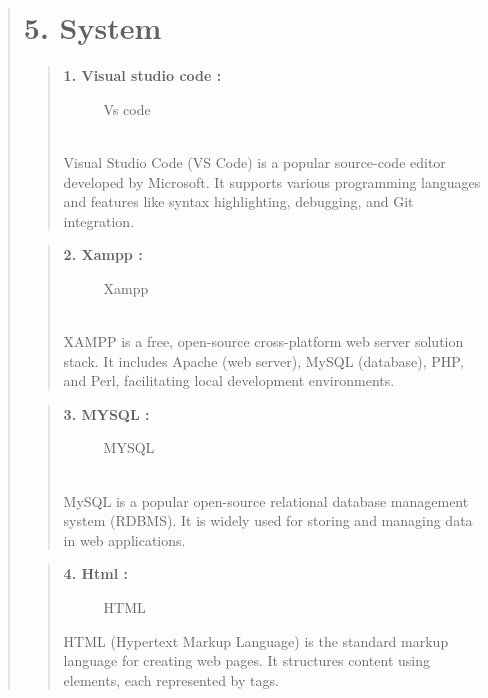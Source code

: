\documentclass[12pt]{report}
\begin{document}
	\begin{quote}
		\section{5. System}
		\begin{quote}
			\textbf{1. Visual studio code :}
			\begin{figure}[h]
				\centering
				\caption{Vs code}
				
			\end{figure}
			\\Visual Studio Code (VS Code) is a popular source-code editor developed by Microsoft. It supports various programming languages and features like syntax highlighting, debugging, and Git integration.
		\end{quote}
		
		\begin{quote}
			\textbf{2. Xampp :}
			\begin{figure}[h]
				\centering
				\caption{Xampp}
				
			\end{figure}
			\\XAMPP is a free, open-source cross-platform web server solution stack. It includes Apache (web server), MySQL (database), PHP, and Perl, facilitating local development environments.
		\end{quote}
		
		\begin{quote}
			\textbf{3. MYSQL :}
			\begin{figure}[h]
				\centering
				\caption{MYSQL}
				
			\end{figure}
			\\MySQL is a popular open-source relational database management system (RDBMS). It is widely used for storing and managing data in web applications.
		\end{quote}
		\clearpage
		
		\begin{quote}
			\textbf{4. Html :}\\
			\begin{figure}
				\centering
				\caption{HTML}
			\end{figure}
			HTML (Hypertext Markup Language) is the standard markup language for creating web pages. It structures content using elements, each represented by tags.
		\end{quote}
		

\end{quote}
\end{document}
